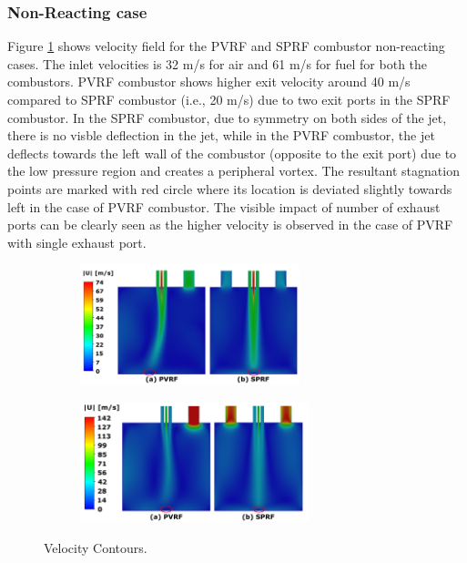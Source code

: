 \subsubsection{Non-Reacting case}
Figure \ref{NonVelCont} shows velocity field for the PVRF and SPRF combustor non-reacting cases. The inlet velocities is 32 m/s for air and 61 m/s for fuel for both the combustors. PVRF combustor shows higher exit velocity around 40 m/s compared to SPRF combustor (i.e., 20 m/s) due to two exit ports in the SPRF combustor.
In the SPRF combustor, due to symmetry on both sides of the jet, there is no visble deflection in the jet, while in the PVRF combustor, the jet deflects towards the left wall of the combustor (opposite to the exit port) due to the low pressure region and creates a peripheral vortex. The resultant stagnation points are marked with red circle where its location is deviated slightly towards left in the case of PVRF combustor. The visible impact of number of exhaust ports can be clearly seen as the higher velocity is observed in the case of PVRF with single exhaust port.
\begin{figure}[h!]
\begin{subfigure}[t]{1\textwidth}
    \centering
    \includegraphics[width=0.7\textwidth]{Chapter5/Images/Numerical/Contours/vel_contsNonReacting.png}
    \label{NonVelCont}
\end{subfigure}

 \begin{subfigure}[t]{1\textwidth}
	\centering
        \includegraphics[width=0.73\textwidth]{Chapter5/Images/Numerical/Contours/vel_contsReacting.png}
	\label{ReactingVelCont}
\end{subfigure}
\caption{Velocity Contours.}
\label{fig:FlowFieldContours}
\end{figure}

